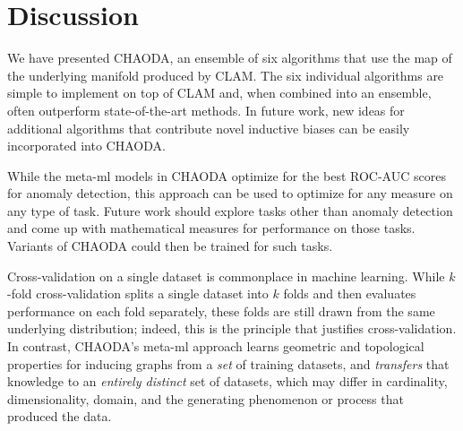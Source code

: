 \section{Discussion}
\label{sec:discussion}

We have presented CHAODA, an ensemble of six algorithms that use the map of the underlying manifold produced by CLAM\@.
The six individual algorithms are simple to implement on top of CLAM and, when combined into an ensemble, often outperform state-of-the-art methods.
In future work, new ideas for additional algorithms that contribute novel inductive biases can be easily incorporated into CHAODA.

While the meta-ml models in CHAODA optimize for the best ROC-AUC scores for anomaly detection, this approach can be used to optimize for any measure on any type of task.
Future work should explore tasks other than anomaly detection and come up with mathematical measures for performance on those tasks.
Variants of CHAODA could then be trained for such tasks.

Cross-validation on a single dataset is commonplace in machine learning.
While $k$-fold cross-validation splits a single dataset into $k$ folds and then evaluates performance on each fold separately, these folds are still drawn from the same underlying distribution; indeed, this is the principle that justifies cross-validation.
In contrast, CHAODA's meta-ml approach learns geometric and topological properties for inducing graphs from a \emph{set} of training datasets, and \emph{transfers} that knowledge to an \emph{entirely distinct} set of datasets, which may differ in cardinality, dimensionality, domain, and the generating phenomenon or process that produced the data.


